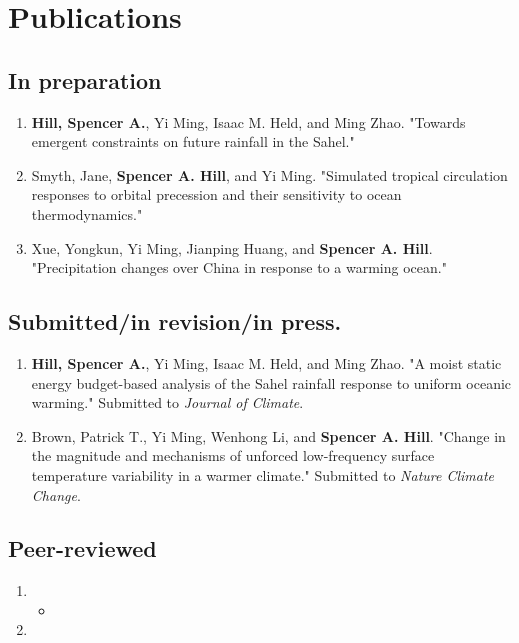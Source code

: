 \documentclass[12pt,letterpaper]{article}
\begin{document}
\section*{Publications}
\label{sec:orgc3a89e5}
\nobibliography*
\subsection*{In preparation}
\label{sec:org874e9a4}
\begin{enumerate}
\item \textbf{Hill, Spencer A.}, Yi Ming, Isaac M. Held, and Ming Zhao.  "Towards emergent
constraints on future rainfall in the Sahel."
\item Smyth, Jane, \textbf{Spencer A. Hill}, and Yi Ming.  "Simulated tropical circulation
responses to orbital precession and their sensitivity to ocean
thermodynamics."
\item Xue, Yongkun, Yi Ming, Jianping Huang, and \textbf{Spencer A. Hill}.  "Precipitation
changes over China in response to a warming ocean."
\end{enumerate}
\subsection*{Submitted/in revision/in press.}
\label{sec:org6378f48}
\begin{enumerate}
\item \textbf{Hill, Spencer A.}, Yi Ming, Isaac M. Held, and Ming Zhao.  "A moist static
energy budget-based analysis of the Sahel rainfall response to uniform
oceanic warming."  Submitted to \emph{Journal of
Climate}.
\item Brown, Patrick T., Yi Ming, Wenhong Li, and \textbf{Spencer A. Hill}.  "Change in the
magnitude and mechanisms of unforced low-frequency surface temperature
variability in a warmer climate."  Submitted to \emph{Nature Climate Change}.
\end{enumerate}
\subsection*{Peer-reviewed}
\label{sec:orgee6c68e}
\begin{enumerate}
\item {}
\begin{itemize}
\item {}
\end{itemize}
\item {}
\end{enumerate}
\end{document}
